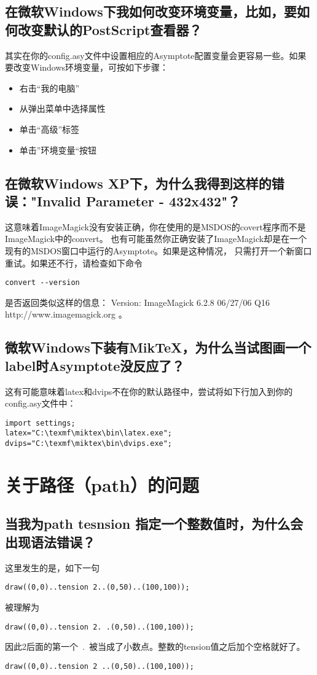 \subsection{\label{Q2.11}在微软Windows下我如何改变环境变量，比如，要如何改变默认的PostScript查看器？}
其实在你的config.asy文件中设置相应的Asymptote配置变量会更容易一些。如果要改变Windows环境变量，可按如下步骤：
\begin{itemize}
\item 右击“我的电脑”
\item 从弹出菜单中选择属性
\item 单击“高级”标签
\item 单击”环境变量“按钮
\end{itemize}

\subsection{\label{Q2.12}在微软Windows XP下，为什么我得到这样的错误："Invalid Parameter - 432x432"？}
这意味着ImageMagick没有安装正确，你在使用的是MSDOS的covert程序而不是ImageMagick中的convert。
也有可能虽然你正确安装了ImageMagick却是在一个现有的MSDOS窗口中运行的Asymptote。如果是这种情况，
只需打开一个新窗口重试。如果还不行，请检查如下命令
\begin{verbatim}
convert --version
\end{verbatim}
是否返回类似这样的信息： Version: ImageMagick 6.2.8 06/27/06 Q16 http://www.imagemagick.org 。

\subsection{\label{Q2.13}微软Windows下装有MikTeX，为什么当试图画一个label时Asymptote没反应了？}
这有可能意味着latex和dvips不在你的默认路径中，尝试将如下行加入到你的config.asy文件中：

\begin{verbatim}
import settings;
latex="C:\texmf\miktex\bin\latex.exe";
dvips="C:\texmf\miktex\bin\dvips.exe";
\end{verbatim}

\section{\label{Q3}关于路径（path）的问题}
\subsection{\label{Q3.1}当我为path tesnsion 指定一个整数值时，为什么会出现语法错误？}
这里发生的是，如下一句
\begin{lstlisting}
draw((0,0)..tension 2..(0,50)..(100,100));
\end{lstlisting}
被理解为
\begin{lstlisting}
draw((0,0)..tension 2. .(0,50)..(100,100));
\end{lstlisting}
因此2后面的第一个~.~被当成了小数点。整数的tension值之后加个空格就好了。 
\begin{lstlisting}
draw((0,0)..tension 2 ..(0,50)..(100,100));
\end{lstlisting}

